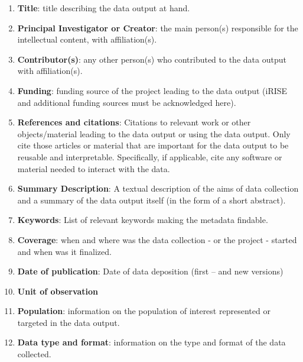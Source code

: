 \documentclass[
]{article}
\providecommand{\tightlist}{%
  \setlength{\itemsep}{0pt}\setlength{\parskip}{0pt}}
\begin{document}
\begin{enumerate}
\def\labelenumi{\arabic{enumi}.}
\tightlist
\item
  \textbf{Title}: title describing the data output at hand.\\
\item
  \textbf{Principal Investigator or Creator}: the main person(s) responsible for the intellectual content, with affiliation(s).\\
\item
  \textbf{Contributor(s)}: any other person(s) who contributed to the data output with affiliation(s).\\
\item
  \textbf{Funding}: funding source of the project leading to the data output (iRISE and additional funding sources must be acknowledged here).\\
\item
  \textbf{References and citations}: Citations to relevant work or other objects/material leading to the data output or using the data output. Only cite those articles or material that are important for the data output to be reusable and interpretable. Specifically, if applicable, cite any software or material needed to interact with the data.\\
\item
  \textbf{Summary \textbar{} Description}: A textual description of the aims of data collection and a summary of the data output itself (in the form of a short abstract).\\
\item
  \textbf{Keywords}: List of relevant keywords making the metadata findable.\\
\item
  \textbf{Coverage}: when and where was the data collection - or the project - started and when was it finalized.\\
\item
  \textbf{Date of publication}: Date of data deposition (first -- and new versions)\\
\item
  \textbf{Unit of observation}\\
\item
  \textbf{Population}: information on the population of interest represented or targeted in the data output.\\
\item
  \textbf{Data type and format}: information on the type and format of the data collected.\\

\end{enumerate}
\end{document}
